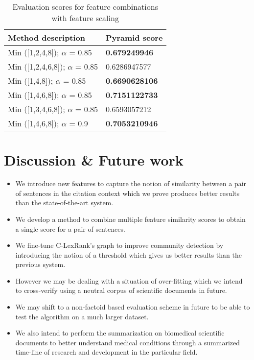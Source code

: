 \begin{table}[!htbp]
\centering
\begin{tabular}{l|l}
\hline
\textbf{Method description}              & \textbf{Pyramid score} \\ \hline
Min ({[}1,2,4,8{]}); $ \alpha $ = 0.85   & \textbf{0.679249946}   \\ \hline
Min ({[}1,2,4,6,8{]}); $ \alpha $ = 0.85 & 0.6286947577           \\ \hline
Min ({[}1,4,8{]}); $ \alpha $ = 0.85     & \textbf{0.6690628106}  \\ \hline
Min ({[}1,4,6,8{]}); $ \alpha $ = 0.85   & \textbf{0.7151122733}  \\ \hline
Min ({[}1,3,4,6,8{]}); $ \alpha $ = 0.85 & 0.6593057212           \\ \hline
Min ({[}1,4,6,8{]}); $ \alpha $ = 0.9    & \textbf{0.7053210946}  \\ \hline
\end{tabular}

\caption{Evaluation scores for feature combinations with feature scaling }
\label{result2}

\end{table} 
\pagebreak
\section{Discussion \& Future work}
\begin{itemize}
\item We introduce new features to capture the notion of similarity between a pair of sentences in the citation context which we prove produces better results than the state-of-the-art system.
\item We develop a method to combine multiple feature similarity scores to obtain a single score for a pair of sentences. 
\item We fine-tune C-LexRank's graph to improve community detection by introducing the notion of a threshold which gives us better results than the previous system.
\item However we may be dealing with a situation of over-fitting which we intend to cross-verify using a neutral corpus of scientific documents in future.
\item We may shift to a non-factoid based evaluation scheme in future to be able to test the algorithm on a much larger dataset.
\item We also intend to perform the summarization on biomedical scientific documents to better understand medical conditions through a summarized time-line of research and development in the particular field.

\end{itemize}
